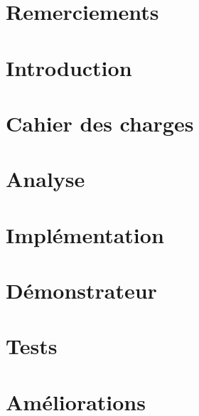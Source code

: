 \documentclass[
    reds, %
    ie, %
]{heig-tb}
\begin{document}
\maketitle
\frontmatter
\clearemptydoublepage

\preamble
\authentification

\clearemptydoublepage
\chapter{Remerciements}

\clearemptydoublepage

\begin{abstract}
    
\end{abstract}

\clearemptydoublepage
{
    \tableofcontents
    \let\cleardoublepage\clearpage
    \listoffigures
    \let\cleardoublepage\clearpage
    \listoftables
    \let\cleardoublepage\clearpage
    \listoflistings
}

\printnomenclature
\clearemptydoublepage
{}

\mainmatter
\chapter{Introduction}

\chapter{Cahier des charges}

\chapter{Analyse}

\chapter{Implémentation}

\chapter{Démonstrateur}

\chapter{Tests}

\chapter{Améliorations}

\end{document}
